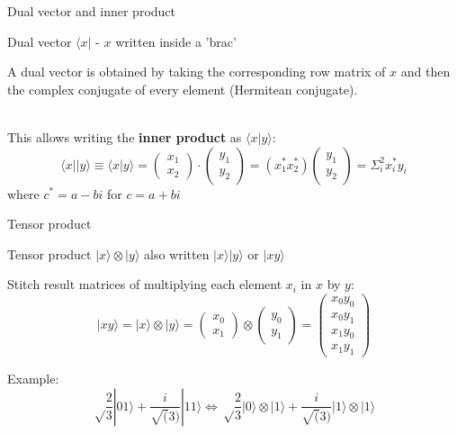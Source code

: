 \documentclass[svgnames,smaller,aspectratio=169]{beamer}
\begin{document}
\begin{frame}[fragile]{Dual vector and inner product}
    \begin{block}{Dual vector}
       $\langle x |$ - $x$ written inside a 'brac'
    \end{block}
  A dual vector is obtained by taking the corresponding row matrix of $x$ and then the complex conjugate of every
  element (Hermitean conjugate). \\~\

  This allows writing the \textbf{inner product} as $\langle x | y \rangle$:
  \begin{equation*}
    \langle x || y \rangle \equiv \langle x | y \rangle = \begin{pmatrix} x_1 \\ x_2 \end{pmatrix}
    \cdot \begin{pmatrix} y_1 \\ y_2 \end{pmatrix} = (x_1^* x_2^*)\begin{pmatrix} y_1 \\ y_2 \end{pmatrix} =
    \Sigma_i^2x_i^* y_i
  \end{equation*}
   where $c^*=a-bi$  for $c=a+bi$
\end{frame}



\begin{frame}[fragile]{Tensor product}
  \begin{block}{Tensor product}
   $|x\rangle\otimes|y\rangle$ also written $|x\rangle|y\rangle$ or $|xy\rangle$
  \end{block}
  Stitch result matrices of multiplying each element $x_i$ in $x$ by $y$:
$$|xy\rangle = |x\rangle\otimes|y\rangle = \begin{pmatrix} x_0 \\ x_1 \end{pmatrix} \otimes \begin{pmatrix} y_0 \\ y_1 \end{pmatrix}
  = \begin{pmatrix} x_0 y_0 \\ x_0 y_1 \\ x_1 y_0 \\ x_1 y_1 \end{pmatrix}$$
  
Example: $$\sqrt\frac{2}{3}|01\rangle + \frac{i}{\sqrt(3)}|11\rangle \Longleftrightarrow \sqrt\frac{2}{3}|0\rangle\otimes|1\rangle + \frac{i}{\sqrt(3)}|1\rangle\otimes|1\rangle$$
\end{frame}
\end{document}
